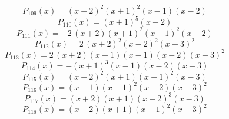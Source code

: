 \subitem \begin{dmath*}P_{109}(x) = {\left(x + 2\right)}^{2} {\left(x + 1\right)}^{2} {\left(x - 1\right)} {\left(x - 2\right)} \end{dmath*}\vspace{-1.2cm}
\subitem \begin{dmath*}P_{110}(x) = {\left(x + 1\right)}^{5} {\left(x - 2\right)} \end{dmath*}\vspace{-1.2cm}
\subitem \begin{dmath*}P_{111}(x) = -2 \, {\left(x + 2\right)} {\left(x + 1\right)}^{2} {\left(x - 1\right)}^{2} {\left(x - 2\right)} \end{dmath*}\vspace{-1.2cm}
\subitem \begin{dmath*}P_{112}(x) = 2 \, {\left(x + 2\right)}^{2} {\left(x - 2\right)}^{2} {\left(x - 3\right)}^{2} \end{dmath*}\vspace{-1.2cm}
\subitem \begin{dmath*}P_{113}(x) = 2 \, {\left(x + 2\right)} {\left(x + 1\right)} {\left(x - 1\right)} {\left(x - 2\right)} {\left(x - 3\right)}^{2} \end{dmath*}\vspace{-1.2cm}
\subitem \begin{dmath*}P_{114}(x) = -{\left(x + 1\right)}^{3} {\left(x - 1\right)} {\left(x - 2\right)} {\left(x - 3\right)} \end{dmath*}\vspace{-1.2cm}
\subitem \begin{dmath*}P_{115}(x) = {\left(x + 2\right)}^{2} {\left(x + 1\right)} {\left(x - 1\right)}^{2} {\left(x - 3\right)} \end{dmath*}\vspace{-1.2cm}
\subitem \begin{dmath*}P_{116}(x) = {\left(x + 1\right)} {\left(x - 1\right)}^{2} {\left(x - 2\right)} {\left(x - 3\right)}^{2} \end{dmath*}\vspace{-1.2cm}
\subitem \begin{dmath*}P_{117}(x) = {\left(x + 2\right)} {\left(x + 1\right)} {\left(x - 2\right)}^{3} {\left(x - 3\right)} \end{dmath*}\vspace{-1.2cm}
\subitem \begin{dmath*}P_{118}(x) = {\left(x + 2\right)} {\left(x + 1\right)} {\left(x - 1\right)}^{2} {\left(x - 3\right)}^{2} \end{dmath*}\vspace{-1.2cm}
